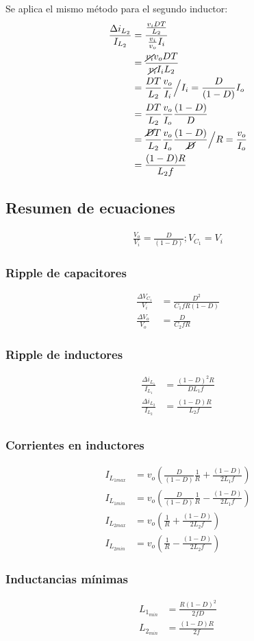 Se aplica el mismo método para el segundo inductor:
\begin{align*}
    \frac{\Delta i_{L_2}}{I_{L_2}}&=\frac{\frac{v_i DT}{L_2}}{\frac{v_i}{v_o}I_i} \\ 
    &=\frac{\cancel{v_i} v_o DT}{\cancel{v_i} I_i L_2} \\ 
    &=\frac{DT}{L_2}\frac{v_o}{I_i} \Big/ I_i=\frac{D}{(1-D)}I_o \\ 
    &=\frac{DT}{L_2}\frac{v_o}{I_o}\frac{(1-D)}{D} \\ 
    &=\frac{\cancel{D}T}{L_2}\frac{v_o}{I_o}\frac{(1-D)}{\cancel{D}} \Big/ R=\frac{v_o}{I_o} \\ 
    &=\frac{(1-D)R}{L_2 f}
\end{align*}

\clearpage
\subsection{Resumen de ecuaciones}
\begin{align*}
    \frac{V_o}{V_i}=\frac{D}{(1-D)} ; V_{C_1}=V_i
\end{align*}
\subsubsection*{Ripple de capacitores}
\begin{align*}
    \frac{\Delta V_{C_1}}{V_i}&=\frac{D^2}{C_1 f R (1-D)} \\ 
    \frac{\Delta V_{o}}{V_o}&=\frac{D}{C_2 f R}
\end{align*}

\subsubsection*{Ripple de inductores}
\begin{align*}
    \frac{\Delta i_{L_1}}{I_{L_1}}&=\frac{(1-D)^2R}{D L_1 f} \\ 
    \frac{\Delta i_{L_2}}{I_{L_2}}&=\frac{(1-D)R}{L_2 f} \\ 
\end{align*}
\subsubsection*{Corrientes en inductores}
\begin{align*}
    I_{L_{1max}}&=v_o\left(\frac{D}{(1-D)}\frac{1}{R}+\frac{(1-D)}{2 L_1 f}\right) \\
    I_{L_{1min}}&=v_o\left(\frac{D}{(1-D)}\frac{1}{R}-\frac{(1-D)}{2 L_1 f}\right) \\ 
    I_{L_{2max}}&=v_o\left(\frac{1}{R}+\frac{(1-D)}{2L_2f}\right) \\ 
    I_{L_{2min}}&=v_o\left(\frac{1}{R}-\frac{(1-D)}{2L_2f}\right)
\end{align*}
\subsubsection*{Inductancias mínimas}
\begin{align*}
    L_{1_{min}}&=\frac{R(1-D)^2}{2f D} \\ 
    L_{2_{min}}&=\frac{(1-D)R}{2 f}
\end{align*}

